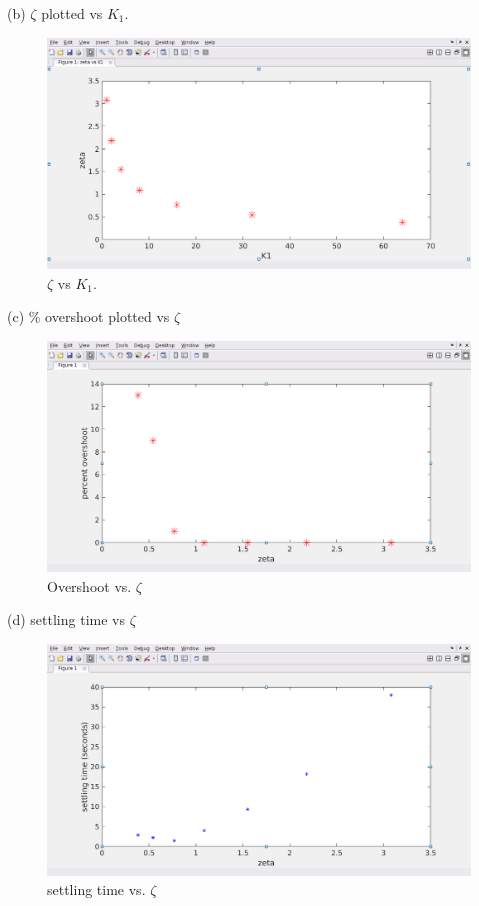 \documentclass[11pt,a4paper]{article}
\begin{document}
\begin{enumerate}
(b) $\zeta$ plotted vs $K_{1}$.
\begin{figure}[H]
\includegraphics[width=\textwidth]{imglab/lab2sol_zetavsk.png}
\caption{$\zeta$ vs $K_{1}$. }
\label{fig:zetavsk}
\end{figure}

(c) \% overshoot plotted vs $\zeta$
\begin{figure}[H]
\includegraphics[width=\textwidth]{imglab/lab2sol_osvszeta.png}
\caption{Overshoot vs. $\zeta$ }
\label{fig:osvszeta}
\end{figure}

(d) settling time vs $\zeta$
\begin{figure}[H]
\includegraphics[width=\textwidth]{imglab/lab2sol_stvszeta.png}
\caption{settling time vs. $\zeta$ }
\label{fig:stvszeta}
\end{figure}


\end{enumerate}
\end{document}
